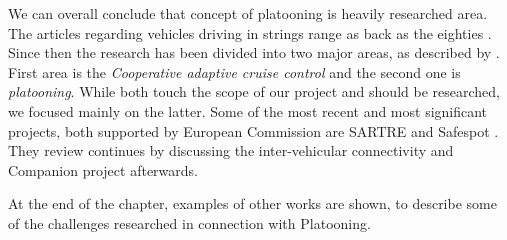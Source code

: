 % 
% 
We can overall conclude that concept of platooning is heavily researched area. The articles regarding vehicles driving in strings range as back as the eighties \cite{Peppard1974StringSystems}.
Since then the research has been divided into two major areas, as described by \cite{Vinel2015Vehicle-to-vehicleScenarios}. First area is the \emph{Cooperative adaptive cruise control} and the second one is \emph{platooning}. While both touch the scope of our project and should be researched, we focused mainly on the latter. Some of the most recent and most significant projects, both supported by European Commission are SARTRE \cite{Chan2012ProjectSARTRE} and Safespot \cite{Safespot}. They review continues by discussing the inter-vehicular connectivity and Companion project afterwards.\par
% 
At the end of the chapter, examples of other works are shown, to describe some of the challenges researched in connection with Platooning.